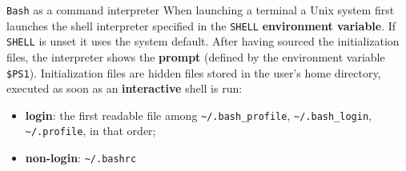 \documentclass{beamer}
\begin{document}
\begin{frame}{\texttt{Bash} as a command interpreter}
When launching a terminal a Unix system first launches the shell interpreter specified in the \texttt{SHELL} \textbf{environment variable}. If \texttt{SHELL} is unset it uses the system default.
\vfill
After having sourced the initialization files, the interpreter shows the \textbf{prompt} (defined by the environment variable \texttt{\$PS1}).
\vfill
Initialization files are hidden files stored in the user's home directory, executed as soon as an \textbf{interactive} shell is run:
\begin{itemize}
    \item \textbf{login}: the first readable file among \texttt{\~{}/.bash\_profile}, \texttt{\~{}/.bash\_login}, \texttt{\~{}/.profile}, in that order;
    \item \textbf{non-login}: \texttt{\~{}/.bashrc}
\end{itemize}
\end{frame}
\end{document}
